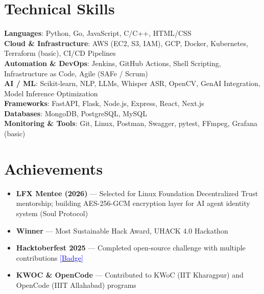 \documentclass[a4paper,10pt]{article}
\newcommand{\resumeItem}[1]{\item\small{#1 \vspace{-2pt}}}
\newcommand{\resumeSubHeadingListStart}{\begin{itemize}[leftmargin=*]}
\newcommand{\resumeSubHeadingListEnd}{\end{itemize}}
\begin{document}
\section{Technical Skills}
\begin{itemize}[leftmargin=*]
\small{\item{
\textbf{Languages}: Python, Go, JavaScript, C/C++, HTML/CSS \\
\textbf{Cloud \& Infrastructure}: AWS (EC2, S3, IAM), GCP, Docker, Kubernetes, Terraform (basic), CI/CD Pipelines \\
\textbf{Automation \& DevOps}: Jenkins, GitHub Actions, Shell Scripting, Infrastructure as Code, Agile (SAFe / Scrum) \\
\textbf{AI / ML}: Scikit-learn, NLP, LLMs, Whisper ASR, OpenCV, GenAI Integration, Model Inference Optimization \\
\textbf{Frameworks}: FastAPI, Flask, Node.js, Express, React, Next.js \\
\textbf{Databases}: MongoDB, PostgreSQL, MySQL \\
\textbf{Monitoring \& Tools}: Git, Linux, Postman, Swagger, pytest, FFmpeg, Grafana (basic)
}}
\end{itemize}

\section{Achievements}
\resumeSubHeadingListStart
\resumeItem{\textbf{LFX Mentee (2026)} — Selected for Linux Foundation Decentralized Trust mentorship; building AES-256-GCM encryption layer for AI agent identity system (Soul Protocol)}
\resumeItem{\textbf{Winner} — Most Sustainable Hack Award, UHACK 4.0 Hackathon}
\resumeItem{\textbf{Hacktoberfest 2025} — Completed open-source challenge with multiple contributions \href{https://www.holopin.io/@sshekhar563}{\textcolor{blue}{[Badge]}}}
\resumeItem{\textbf{KWOC \& OpenCode} — Contributed to KWoC (IIT Kharagpur) and OpenCode (IIIT Allahabad) programs}
\resumeSubHeadingListEnd
\end{document}
